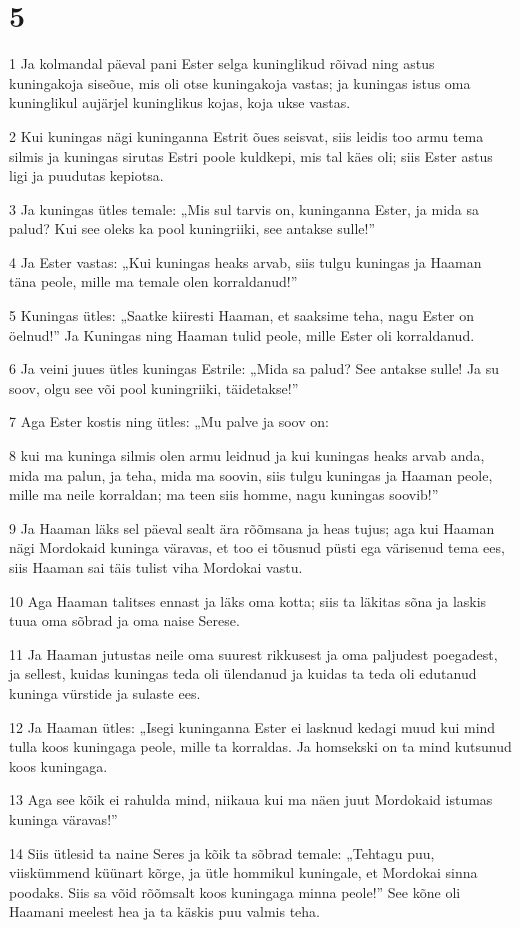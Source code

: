 \chapter{5}

\par 1 Ja kolmandal päeval pani Ester selga kuninglikud rõivad ning astus kuningakoja siseõue, mis oli otse kuningakoja vastas; ja kuningas istus oma kuninglikul aujärjel kuninglikus kojas, koja ukse vastas.
\par 2 Kui kuningas nägi kuninganna Estrit õues seisvat, siis leidis too armu tema silmis ja kuningas sirutas Estri poole kuldkepi, mis tal käes oli; siis Ester astus ligi ja puudutas kepiotsa.
\par 3 Ja kuningas ütles temale: „Mis sul tarvis on, kuninganna Ester, ja mida sa palud? Kui see oleks ka pool kuningriiki, see antakse sulle!”
\par 4 Ja Ester vastas: „Kui kuningas heaks arvab, siis tulgu kuningas ja Haaman täna peole, mille ma temale olen korraldanud!”
\par 5 Kuningas ütles: „Saatke kiiresti Haaman, et saaksime teha, nagu Ester on öelnud!” Ja Kuningas ning Haaman tulid peole, mille Ester oli korraldanud.
\par 6 Ja veini juues ütles kuningas Estrile: „Mida sa palud? See antakse sulle! Ja su soov, olgu see või pool kuningriiki, täidetakse!”
\par 7 Aga Ester kostis ning ütles: „Mu palve ja soov on:
\par 8 kui ma kuninga silmis olen armu leidnud ja kui kuningas heaks arvab anda, mida ma palun, ja teha, mida ma soovin, siis tulgu kuningas ja Haaman peole, mille ma neile korraldan; ma teen siis homme, nagu kuningas soovib!”
\par 9 Ja Haaman läks sel päeval sealt ära rõõmsana ja heas tujus; aga kui Haaman nägi Mordokaid kuninga väravas, et too ei tõusnud püsti ega värisenud tema ees, siis Haaman sai täis tulist viha Mordokai vastu.
\par 10 Aga Haaman talitses ennast ja läks oma kotta; siis ta läkitas sõna ja laskis tuua oma sõbrad ja oma naise Serese.
\par 11 Ja Haaman jutustas neile oma suurest rikkusest ja oma paljudest poegadest, ja sellest, kuidas kuningas teda oli ülendanud ja kuidas ta teda oli edutanud kuninga vürstide ja sulaste ees.
\par 12 Ja Haaman ütles: „Isegi kuninganna Ester ei lasknud kedagi muud kui mind tulla koos kuningaga peole, mille ta korraldas. Ja homsekski on ta mind kutsunud koos kuningaga.
\par 13 Aga see kõik ei rahulda mind, niikaua kui ma näen juut Mordokaid istumas kuninga väravas!”
\par 14 Siis ütlesid ta naine Seres ja kõik ta sõbrad temale: „Tehtagu puu, viiskümmend küünart kõrge, ja ütle hommikul kuningale, et Mordokai sinna poodaks. Siis sa võid rõõmsalt koos kuningaga minna peole!” See kõne oli Haamani meelest hea ja ta käskis puu valmis teha.

